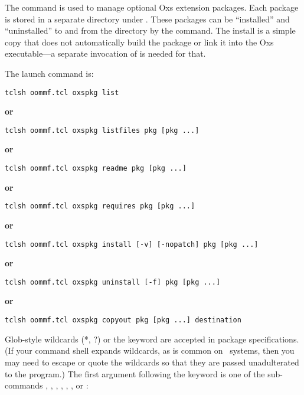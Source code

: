 The  command is used to manage optional Oxs extension
packages.  Each package is stored in a separate directory under
.  These packages can be ``installed'' and
``uninstalled'' to and from the  directory by
the  command.  The install is a simple copy that does not
automatically build the package or link it into the Oxs executable---a
separate invocation of
is needed for that.

The  launch command is:
\begin{duplex}
\item \verb+tclsh oommf.tcl oxspkg list+
\item[\textbf{or}]\html{\\}
\item \verb+tclsh oommf.tcl oxspkg listfiles pkg [pkg ...]+
\item[\textbf{or}]\html{\\}
\item \verb+tclsh oommf.tcl oxspkg readme pkg [pkg ...]+
\item[\textbf{or}]\html{\\}
\item \verb+tclsh oommf.tcl oxspkg requires pkg [pkg ...]+
\item[\textbf{or}]\html{\\}
\item \verb+tclsh oommf.tcl oxspkg install [-v] [-nopatch] pkg [pkg ...]+
\item[\textbf{or}]\html{\\}
\item \verb+tclsh oommf.tcl oxspkg uninstall [-f] pkg [pkg ...]+
\item[\textbf{or}]\html{\\}
\item \verb+tclsh oommf.tcl oxspkg copyout pkg [pkg ...] destination+
\end{duplex}
Glob-style wildcards (*, ?) or the keyword  are accepted in
package specifications.  (If your command shell expands wildcards, as
is common on \Unix\ systems, then you may need to escape or quote the
wildcards so that they are passed unadulterated to the 
program.)  The first argument following the 
keyword is one of the sub-commands , ,
, , , , or
:
